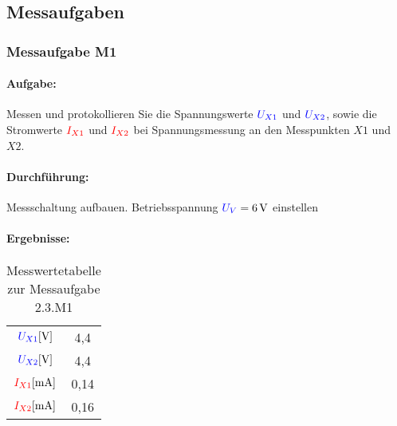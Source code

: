 \documentclass[11pt,a4paper,titlepage]{scrreprt}
\begin{document}
            \subsection{Messaufgaben}
                \subsubsection{Messaufgabe M1}
                    \paragraph{Aufgabe:} Messen und protokollieren Sie die Spannungswerte $\textcolor{blue}{U_{X1}}$ und $\textcolor{blue}{U_{X2}}$, sowie die Stromwerte $\textcolor{red}{I_{X1}}$ und $\textcolor{red}{I_{X2}}$ bei Spannungsmessung an den Messpunkten $X1$ und $X2$. 
                    
                    \paragraph{Durchführung:} Messschaltung aufbauen. Betriebsspannung $\textcolor{blue}{U_V} = \SI{6}{\volt}$ einstellen
                    \pagebreak
                    \paragraph{Ergebnisse:}
                        \begin{center}
                            \begin{table}[!hbtp]
                                \caption{Messwertetabelle zur Messaufgabe 2.3.M1}
                                \label{tbl:messergebnisse2.2}
                                \renewcommand{\arraystretch}{1.3}
                                \begin{center}
                                    \begin{tabular}{c|c}
                                        $\textcolor{blue}{U_{X1}} [\si{\volt}]$ & 4,4\\
                                        $\textcolor{blue}{U_{X2}} [\si{\volt}]$ & 4,4\\ \hline
                                        $\textcolor{red}{I_{X1}} [\si{\milli\ampere}]$ & 0,14\\
                                        $\textcolor{red}{I_{X2}} [\si{\milli\ampere}]$ & 0,16
                                    \end{tabular}
                                \end{center}
                            \end{table}
                        \end{center}
                  
\end{document}
